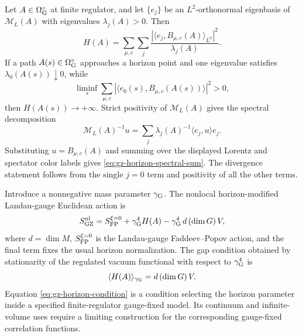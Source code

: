 Let \(A\in\Omega_{\rm G}^{\circ}\) at finite regulator, and let
\(\{e_j\}\) be an \(L^2\)-orthonormal eigenbasis of
\(\mathcal M_L(A)\) with eigenvalues \(\lambda_j(A)>0\).  Then
\begin{equation}
  H(A)
  =
  \sum_{\mu,c}\sum_j
  \frac{|\langle e_j,B_{\mu,c}(A)\rangle_{L^2}|^2}{\lambda_j(A)}.
  \label{eq:gz-horizon-spectral-sum}
\end{equation}
If a path \(A(s)\in\Omega_{\rm G}^{\circ}\) approaches a horizon point and one
eigenvalue satisfies \(\lambda_0(A(s))\downarrow0\), while
\[
  \liminf_s
  \sum_{\mu,c}
  |\langle e_0(s),B_{\mu,c}(A(s))\rangle|^2
  >0,
\]
then \(H(A(s))\to+\infty\).
Strict positivity of \(\mathcal M_L(A)\) gives the spectral decomposition
\[
  \mathcal M_L(A)^{-1}u
  =
  \sum_j\lambda_j(A)^{-1}\langle e_j,u\rangle e_j .
\]
Substituting \(u=B_{\mu,c}(A)\) and summing over the displayed Lorentz and
spectator color labels gives \eqref{eq:gz-horizon-spectral-sum}.  The
divergence statement follows from the single \(j=0\) term and positivity of
all the other terms.

Introduce a nonnegative mass parameter \(\gamma_{\rm G}\).  The nonlocal
horizon-modified Landau-gauge Euclidean action is
\begin{equation}
  S_{\rm GZ}^{\rm nl}
  =
  S_{\rm FP}^{\xi=0}
  +\gamma_{\rm G}^4 H(A)
  -\gamma_{\rm G}^4\,d\,(\dim G)\,V,
  \label{eq:gz-nonlocal-action}
\end{equation}
where \(d=\dim M\), \(S_{\rm FP}^{\xi=0}\) is the Landau-gauge
Faddeev--Popov action, and the final term fixes the usual horizon
normalization.  The gap condition obtained by stationarity of the regulated
vacuum functional with respect to \(\gamma_{\rm G}^4\) is
\begin{equation}
  \langle H(A)\rangle_{\gamma_{\rm G}}
  =
  d\,(\dim G)\,V .
  \label{eq:gz-horizon-condition}
\end{equation}
Equation \eqref{eq:gz-horizon-condition} is a condition selecting the
horizon parameter inside a specified finite-regulator gauge-fixed model.  Its
continuum and infinite-volume uses require a limiting construction for the
corresponding gauge-fixed correlation functions.

